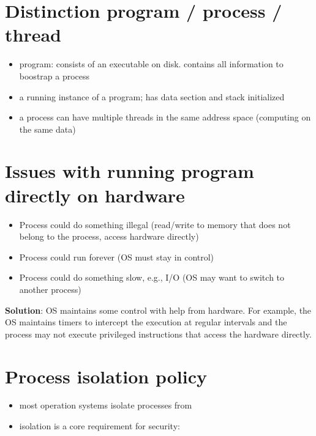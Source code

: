 \section*{Distinction program / process / thread}
\begin{itemize}
\item program: consists of an executable on disk. contains all information to boostrap a process
\item a running instance of a program; has data section and stack initialized
\item a process can have multiple threads in the same address space (computing on the same data)
\end{itemize}
\section*{Issues with running program directly on hardware}
\begin{itemize}
\item Process could do something illegal (read/write to memory that does not belong to the process, access hardware directly)
\item Process could run forever (OS must stay in control)
\item Process could do something slow, e.g., I/O (OS may want to switch to another process)
\end{itemize}
\textbf{Solution}: OS maintains some control with help from hardware. For example, the OS maintains timers to intercept the execution at regular intervals and the process may not execute privileged instructions that access the hardware directly.
\section*{Process isolation policy}
\begin{itemize}
\item most operation systems isolate processes from
\item isolation is a core requirement for security:
\end{itemize}
